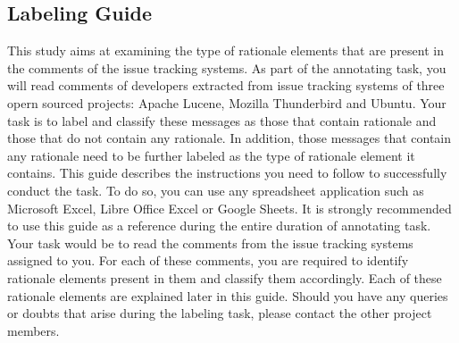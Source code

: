 \documentclass[a4paper,12pt,twoside]{report}
\begin{document}
\begin{appendices}
\chapter{Labeling Guide}
This study aims at examining the type of rationale elements that are present in the comments of the issue tracking systems.
\newline \newline
As part of the annotating task, you will read comments of developers extracted from issue tracking systems of three opern sourced projects: Apache Lucene, Mozilla Thunderbird and Ubuntu. Your task is to label and classify these messages as those that contain rationale and those that do not contain any rationale. In addition, those messages that contain any rationale need to be further labeled as the type of rationale element it contains. 
\newline \newline
This guide describes the instructions you need to follow to successfully conduct the task. To do so, you can use any spreadsheet application such as Microsoft Excel, Libre Office Excel or Google Sheets. It is strongly recommended to use this guide as a reference during the entire duration of annotating task. 
\newline \newline
Your task would be to read the comments from the issue tracking systems assigned to you. For each of these comments, you are required to identify rationale elements present in them and classify them accordingly. Each of these rationale elements are explained later in this guide. 
\newline \newline
Should you have any queries or doubts that arise during the labeling task, please contact the other project members. 

\end{appendices}
\end{document}
